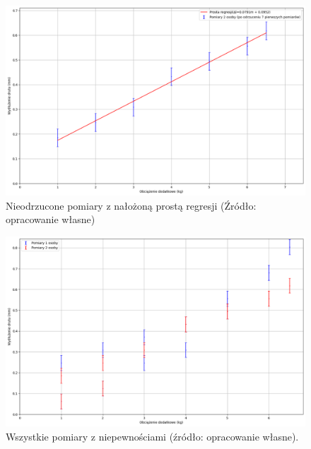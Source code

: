 \documentclass[a4paper,12pt]{article}
\begin{document}
\begin{figure}[H]
    \centering
    \includegraphics[width=1.2\linewidth,angle=90]{prosta_regresji.png}
    \caption{Nieodrzucone pomiary z nałożoną prostą regresji (Źródło: opracowanie własne)}
    \label{fig:prosta_regresji}
\end{figure}


\newpage

\begin{figure}[H]
    \centering
    \includegraphics[width=1.2\linewidth,angle=90]{wszystkie_pomiary.png}
    \caption{Wszystkie pomiary z niepewnościami (źródło: opracowanie własne).}
    \label{fig:wszystkie_pomiary}
\end{figure}


\end{document}
